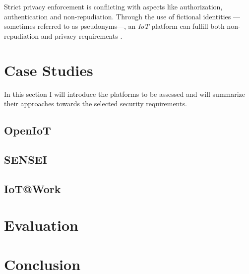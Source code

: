 \documentclass[journal]{IEEEtran}
\begin{document}
  Strict privacy enforcement is conflicting with aspects like authorization, authentication and non-repudiation. Through the use of fictional identities ---sometimes referred to as pseudonyms---, an \emph{IoT} platform can fulfill both non-repudiation and privacy requirements \cite{Baldini2012}. 
  
\section{Case Studies}
  In this section I will introduce the platforms to be assessed and will summarize their approaches towards the selected security requirements.
  
  

  \subsection{OpenIoT}

  \subsection{SENSEI}

  \subsection{IoT@Work}

\section{Evaluation}

\section{Conclusion}



\end{document}
